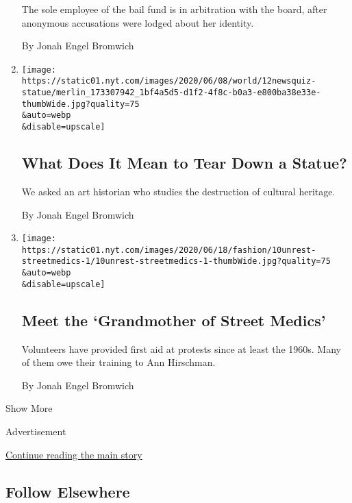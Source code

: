 \begin{enumerate}
  The sole employee of the bail fund is in arbitration with the board,
  after anonymous accusations were lodged about her identity.

  By Jonah Engel Bromwich
\item
  \href{/2020/06/11/style/confederate-statue-columbus-analysis.html}{}

  \texttt{[image: https://static01.nyt.com/images/2020/06/08/world/12newsquiz-statue/merlin\_173307942\_1bf4a5d5-d1f2-4f8c-b0a3-e800ba38e33e-thumbWide.jpg?quality=75\\\&auto=webp\\\&disable=upscale]}

  \hypertarget{what-does-it-mean-to-tear-down-a-statue}{%
  \subsection{What Does It Mean to Tear Down a
  Statue?}\label{what-does-it-mean-to-tear-down-a-statue}}

  We asked an art historian who studies the destruction of cultural
  heritage.

  By Jonah Engel Bromwich
\item
  \href{/2020/06/10/style/protest-street-medics.html}{}

  \texttt{[image: https://static01.nyt.com/images/2020/06/18/fashion/10unrest-streetmedics-1/10unrest-streetmedics-1-thumbWide.jpg?quality=75\\\&auto=webp\\\&disable=upscale]}

  \hypertarget{meet-the-grandmother-of-street-medics}{%
  \subsection{Meet the `Grandmother of Street
  Medics'}\label{meet-the-grandmother-of-street-medics}}

  Volunteers have provided first aid at protests since at least the
  1960s. Many of them owe their training to Ann Hirschman.

  By Jonah Engel Bromwich
\end{enumerate}

Show More

Advertisement

\protect\hyperlink{after-mid2}{Continue reading the main story}

\hypertarget{follow-elsewhere}{%
\subsection{Follow Elsewhere}\label{follow-elsewhere}}

